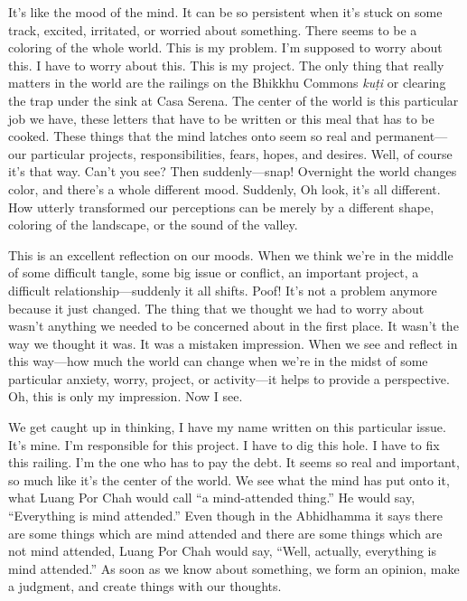 It's like the mood of the mind. It can be so persistent when it's stuck 
on some track, excited, irritated, or worried about something. There 
seems to be a coloring of the whole world. This is my problem. I'm 
supposed to worry about this. I have to worry about this. This is my 
project. The only thing that really matters in the world are the 
railings on the Bhikkhu Commons \emph{kuṭi} or clearing the trap 
under the sink at Casa Serena. The center of the world is this 
particular job we have, these letters that have to be written or this 
meal that has to be cooked. These things that the mind latches onto 
seem so real and permanent---our particular projects, responsibilities, 
fears, hopes, and desires. Well, of course it's that way. Can't you 
see? Then suddenly---snap! Overnight the world changes color, and 
there's a whole different mood. Suddenly, Oh look, it's all different. 
How utterly transformed our perceptions can be merely by a different 
shape, coloring of the landscape, or the sound of the valley.

This is an excellent reflection on our moods. When we think we're in 
the middle of some difficult tangle, some big issue or conflict, an 
important project, a difficult relationship---suddenly it all shifts. 
Poof! It's not a problem anymore because it just changed. The thing 
that we thought we had to worry about wasn't anything we needed to be 
concerned about in the first place. It wasn't the way we thought it 
was. It was a mistaken impression. When we see and reflect in this 
way---how much the world can change when we're in the midst of some 
particular anxiety, worry, project, or activity---it helps to provide a 
perspective. Oh, this is only my impression. Now I see.

We get caught up in thinking, I have my name written on this particular 
issue. It's mine. I'm responsible for this project. I have to dig this 
hole. I have to fix this railing. I'm the one who has to pay the debt. 
It seems so real and important, so much like it's the center of the 
world. We see what the mind has put onto it, what Luang Por Chah would 
call ``a mind-attended thing.'' He would say, ``Everything is mind 
attended.'' Even though in the Abhidhamma it says there are some things 
which are mind attended and there are some things which are not mind 
attended, Luang Por Chah would say, ``Well, actually, everything is 
mind attended.'' As soon as we know about something, we form an 
opinion, make a judgment, and create things with our thoughts.

